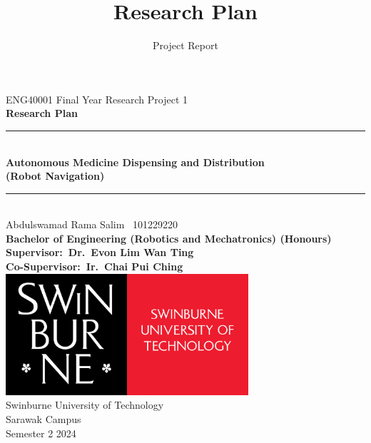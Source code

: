 \documentclass[12pt]{scrartcl}
\title{Research Plan}
\subtitle{Project Report}
\begin{document}
\begin{titlepage}
  \centering
  {\Large ENG40001 Final Year Research Project 1}\\[0.4cm]
  \textbf{\large Research Plan}\\[0.7cm]
  \rule{\textwidth}{0.9pt}\\[0.7cm]
  {\LARGE \textbf{Autonomous Medicine Dispensing and Distribution}}\\[0.3cm]
  {\LARGE \textbf{(Robot Navigation)}}\\[0.3cm]
  \rule{\textwidth}{0.9pt}\\[0.7cm]


  {\large Abdulswamad Rama Salim  \textbar\ 101229220}\\[0.7cm]


  \textbf{\large Bachelor of Engineering (Robotics and Mechatronics) (Honours)}\\[0.5cm]

  \textbf{\large Supervisor:\ Dr.\ Evon Lim Wan Ting}\\[0.1cm]
  \textbf{Co-Supervisor:\ Ir.\ Chai Pui Ching}\\[1.4cm]

  \includegraphics[width=9cm]{pics/Logo_of_Swinburne_University_of.png} \\[1.4cm] %



  {\large Swinburne University of Technology}\\[0.1cm]
  {\large Sarawak Campus}\\[1.5cm]
  {\large Semester 2 2024}
\end{titlepage}



\newpage
\setcounter{page}{1}





%
%
%
%

%
%
%

\clearpage
{}  %


\end{document}

